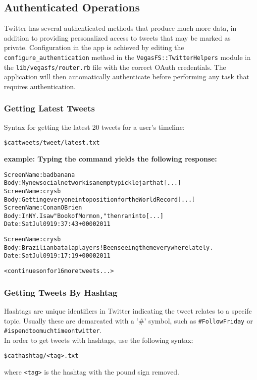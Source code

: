 \subsection{Authenticated Operations}\label{authenticatedoperations}
Twitter has several authenticated methods that produce much more data, in addition to providing personalized access to tweets that may be marked as private. 
Configuration in the app is achieved by editing the \texttt{configure\_authentication} method in the \texttt{VegasFS::TwitterHelpers} module in the \texttt{lib/vegasfs/router.rb} file with the correct OAuth credentials. The application will then automatically authenticate before performing any task that requires authentication.
\subsubsection{Getting Latest Tweets}\label{latesttweets}
Syntax for getting the latest 20 tweets for a user's timeline:
\begin{alltt}
    \$ cat tweets/tweet/latest.txt
\end{alltt}
\bf{example:} Typing the command yields the following response:
\begin{alltt}
    Screen Name:badbanana
    Body:My new social network is an empty pickle jar that[...]
    Screen Name:crysb
    Body:Getting everyone into position for the World Record[...]
    Screen Name:ConanOBrien
    Body:In NY. I saw "Book of Mormon," then ran into [...]
    Date:Sat Jul 09 19:37:43 +0000 2011

    Screen Name:crysb
    Body:Brazilian batala players! Been seeing them everywhere lately.
    Date:Sat Jul 09 19:17:19 +0000 2011

    <continues on for 16 more tweets...>
\end{alltt}

\subsubsection{Getting Tweets By Hashtag}\label{tweetsbyhashtags}

Hashtags are unique identifiers in Twitter indicating the tweet relates to a specifc topic. Usually these are demarcated with a '\#' symbol, such as \texttt{\#FollowFriday} or \texttt{\#ispendtoomuchtimeontwitter}. \\
In order to get tweets with hashtags, use the following syntax:
\begin{alltt}
    \$ cat hashtag/<tag>.txt
\end{alltt}
where \texttt{<tag>} is the hashtag with the pound sign removed. 

